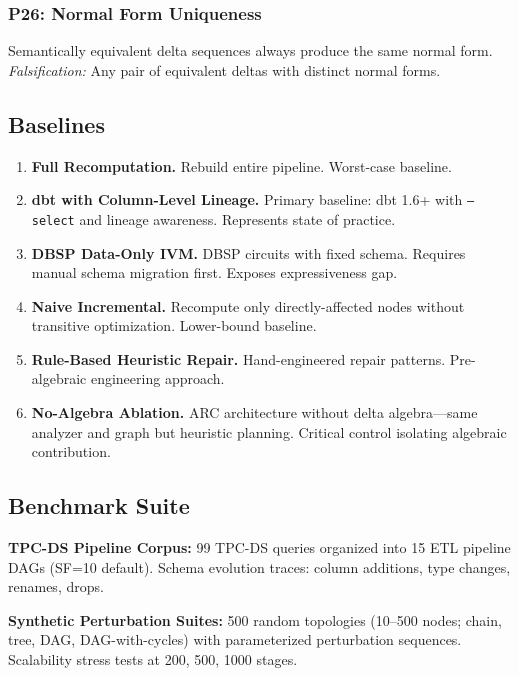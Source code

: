 \documentclass[11pt,a4paper]{article}
\theoremstyle{definition}
\begin{document}
\subsubsection{P26: Normal Form Uniqueness}
Semantically equivalent delta sequences always produce the same normal form.
\emph{Falsification:} Any pair of equivalent deltas with distinct normal forms.

\subsection{Baselines}
\label{sec:baselines}

\begin{enumerate}[label=\textbf{B\arabic*},leftmargin=*]
  \item \textbf{Full Recomputation.}
    Rebuild entire pipeline. Worst-case baseline.

  \item \textbf{dbt with Column-Level Lineage.}
    Primary baseline: dbt 1.6+ with \texttt{--select} and lineage awareness.
    Represents state of practice.

  \item \textbf{DBSP Data-Only IVM.}
    DBSP circuits with fixed schema.  Requires manual schema migration first.
    Exposes expressiveness gap.

  \item \textbf{Naive Incremental.}
    Recompute only directly-affected nodes without transitive optimization.
    Lower-bound baseline.

  \item \textbf{Rule-Based Heuristic Repair.}
    Hand-engineered repair patterns.  Pre-algebraic engineering approach.

  \item \textbf{No-Algebra Ablation.}
    ARC architecture without delta algebra---same analyzer and graph but
    heuristic planning.  Critical control isolating algebraic contribution.
\end{enumerate}

\subsection{Benchmark Suite}
\label{sec:benchmarks}

\textbf{TPC-DS Pipeline Corpus:} 99 TPC-DS queries organized into 15 ETL
pipeline DAGs (SF=10 default).  Schema evolution traces: column additions,
type changes, renames, drops.

\textbf{Synthetic Perturbation Suites:} 500 random topologies (10--500 nodes;
chain, tree, DAG, DAG-with-cycles) with parameterized perturbation sequences.
Scalability stress tests at 200, 500, 1000 stages.
\end{document}
